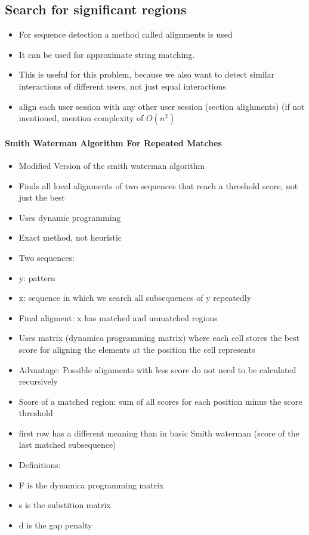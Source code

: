 \subsection{Search for significant regions}		
\begin{itemize}
	\item For sequence detection a method called alignments is used
	\item It can be used for approximate string matching. 
	\item This is useful for this problem, because we also want to detect similar interactions of different users, not just equal interactions
	\item align each user session with any other user session (section alighments)  (if not mentioned, mention complexity of $O(n^2)$
\end{itemize}

\paragraph{Smith Waterman Algorithm For Repeated Matches}
\begin{itemize}
	\item Modified Version of the smith waterman algorithm
	\item Finds all local alignments of two sequences that reach a threshold score, not just the best
	\item Uses dynamic programming
	\item Exact method, not heuristic
	\item Two sequences: 
	\item y: pattern
	\item x: sequence in which we search all subsequences of y repeatedly
	\item Final aligment: x has matched and unmatched regions
	\item Uses matrix (dynamica programming matrix) where each cell stores the best score for aligning the elements at the position the cell represents
	\item Advantage: Possible alignments with less score do not need to be calculated recursively
	\item Score of a matched region: sum of all scores for each position minus the score threshold 
	\item first row has a different meaning than in basic Smith waterman (score of the last matched subsequence)
	\item Definitions:
	\item F is the dynamica programming matrix
	\item s is the substition matrix
	\item d is the gap penalty
\end{itemize}

